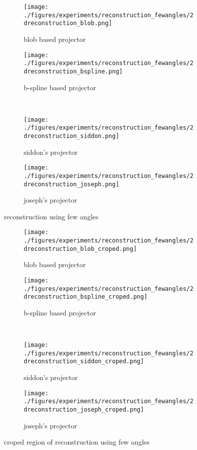 \begin{figure}[h]
	\centering
	\begin{subfigure}[b]{0.45\textwidth}
		\centering
		\texttt{[image: ./figures/experiments/reconstruction\_fewangles/2dreconstruction\_blob.png]}
		\caption{blob based projector}%
		\label{fig:reconstruction_fewangles_blob}
	\end{subfigure}
	\begin{subfigure}[b]{0.45\textwidth}
		\centering
		\texttt{[image: ./figures/experiments/reconstruction\_fewangles/2dreconstruction\_bspline.png]}
		\caption{b-spline based projector}%
		\label{fig:reconstruction_fewangles_bspline}
	\end{subfigure} \\
	\begin{subfigure}[b]{0.45\textwidth}
		\centering
		\texttt{[image: ./figures/experiments/reconstruction\_fewangles/2dreconstruction\_siddon.png]}
		\caption{siddon's projector}%
		\label{fig:reconstruction_fewangles_siddon}
	\end{subfigure}
	\begin{subfigure}[b]{0.45\textwidth}
		\centering
		\texttt{[image: ./figures/experiments/reconstruction\_fewangles/2dreconstruction\_joseph.png]}
		\caption{joseph's projector}%
		\label{fig:reconstruction_fewangles_joseph}
	\end{subfigure}
	\caption{reconstruction using few angles}%
	\label{fig:reconstruction_fewangles}
\end{figure}

\begin{figure}[h]
	\centering
	\begin{subfigure}[b]{0.45\textwidth}
		\centering
		\texttt{[image: ./figures/experiments/reconstruction\_fewangles/2dreconstruction\_blob\_croped.png]}
		\caption{blob based projector}%
		\label{fig:reconstruction_crop_fewangles_blob}
	\end{subfigure}
	\begin{subfigure}[b]{0.45\textwidth}
		\centering
		\texttt{[image: ./figures/experiments/reconstruction\_fewangles/2dreconstruction\_bspline\_croped.png]}
		\caption{b-spline based projector}%
		\label{fig:reconstruction_crop_fewangles_bspline}
	\end{subfigure} \\
	\begin{subfigure}[b]{0.45\textwidth}
		\centering
		\texttt{[image: ./figures/experiments/reconstruction\_fewangles/2dreconstruction\_siddon\_croped.png]}
		\caption{siddon's projector}%
		\label{fig:reconstruction_crop_fewangles_siddon}
	\end{subfigure}
	\begin{subfigure}[b]{0.45\textwidth}
		\centering
		\texttt{[image: ./figures/experiments/reconstruction\_fewangles/2dreconstruction\_joseph\_croped.png]}
		\caption{joseph's projector}%
		\label{fig:reconstruction_crop_fewangles_joseph}
	\end{subfigure}
	\caption{croped region of reconstruction using few angles}%
	\label{fig:reconstruction_crop_fewangles}
\end{figure}

